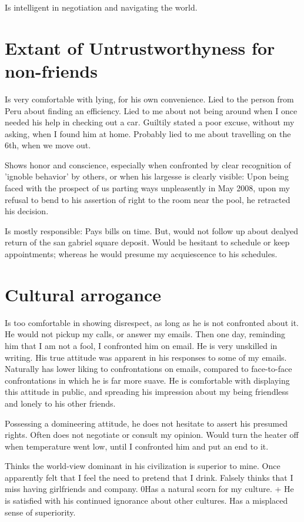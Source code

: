 \documentclass[oneside, article]{memoir}
\begin{document}
Is intelligent in negotiation and navigating the world.

\section{Extant of Untrustworthyness for non-friends}
Is very comfortable with lying, for his own convenience.
\subitem Lied to the person from Peru about finding an efficiency.
\subitem Lied to me about not being around when I once needed his help in checking out a car. Guiltily stated a poor excuse, without my asking, when I found him at home.
\subitem Probably lied to me about travelling on the 6th, when we move out.

Shows honor and conscience, especially when confronted by clear recognition of 'ignoble behavior' by others, or when his largesse is clearly visible:
\subitem Upon being faced with the prospect of us parting ways unpleasently in May 2008, upon my refusal to bend to his assertion of right to the room near the pool, he retracted his decision.

Is mostly responsible:
\subitem Pays bills on time.
\subitem But, would not follow up about dealyed return of the san gabriel square deposit.
\subitem Would be hesitant to schedule or keep appointments; whereas he would presume my acquiescence to his schedules.

\section{Cultural arrogance}
Is too comfortable in showing disrespect, as long as he is not confronted about it.
\subitem He would not pickup my calls, or answer my emails. Then one day, reminding him that I am not a fool, I confronted him on email.
\subitem He is very unskilled in writing. His true attitude was apparent in his responses to some of my emails. Naturally has lower liking to confrontations on emails, compared to face-to-face confrontations in which he is far more suave.
\subitem He is comfortable with displaying this attitude in public, and spreading his impression about my being friendless and lonely to his other friends.

Possessing a domineering attitude, he does not hesitate to assert his presumed rights. Often does not negotiate or consult my opinion.
\subitem Would turn the heater off when temperature went low, until I confronted him and put an end to it.

Thinks the world-view dominant in his civilization is superior to mine.
\subitem Once apparently felt that I feel the need to pretend that I drink.
\subitem Falsely thinks that I miss having girlfriends and company.
0\subitem Has a natural scorn for my culture.
                + He is satisfied with his continued ignorance about other cultures.
\subitem Has a misplaced sense of superiority.
\end{document}
